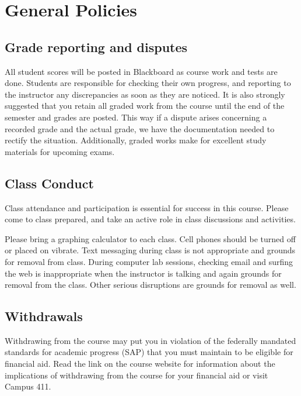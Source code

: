 \documentclass[11pt]{article}
\begin{document}
\section{General Policies}

\subsection {Grade reporting and disputes} All student scores will be posted in Blackboard
as course work and tests are done. Students are responsible for checking their own progress, and
reporting to the instructor any discrepancies as soon as they are noticed. It is also strongly suggested
that you retain all graded work from the course until the end of the semester and grades are posted.
This way if a dispute arises concerning a recorded grade and the actual grade, we have the documentation
needed to rectify the situation. Additionally, graded works make for excellent study materials for upcoming
exams.  

\subsection{Class Conduct}
Class attendance and participation is essential for success in this course. Please come to class prepared,
and take an active role in class discussions and activities.

Please bring a graphing calculator to each class.  Cell phones should be turned off or placed on vibrate.
Text messaging during class is not appropriate and grounds for removal from class.  During computer lab 
sessions, checking email and surfing the web is inappropriate when the instructor is talking and again 
grounds for removal from the class.  Other serious disruptions are grounds for removal as well.

\subsection{Withdrawals}
Withdrawing from the course may put you in violation
of the federally mandated standards for academic progress (SAP) that you must maintain to be eligible for 
financial aid.  Read the link on the course website for information about the implications of withdrawing 
from the course for your financial aid or visit Campus 411.
\end{document}
